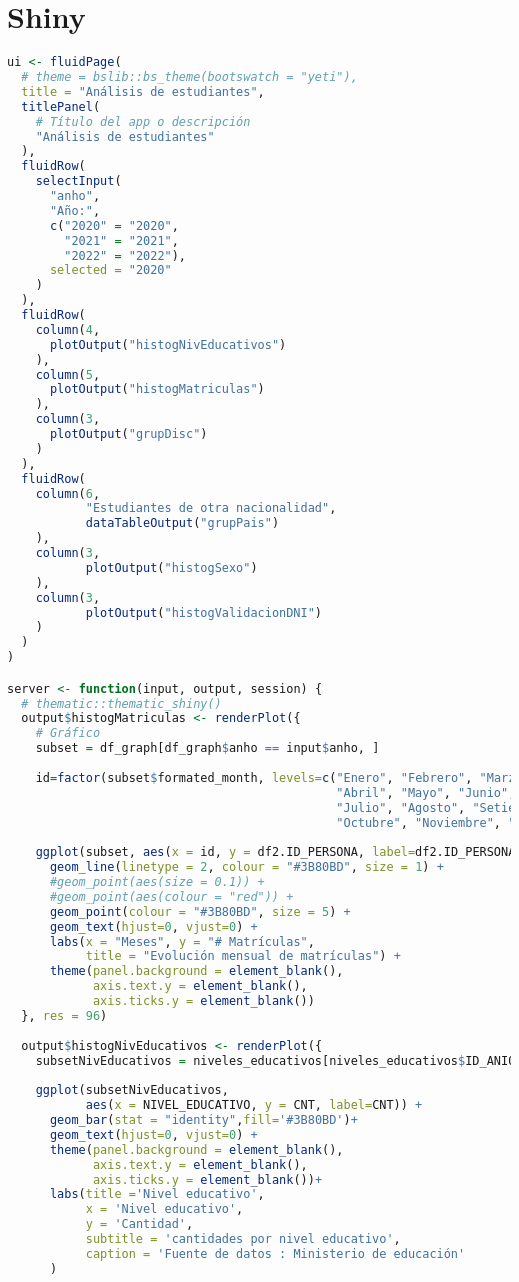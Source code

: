 \section{Shiny}\label{cod_shiny}
\begin{lstlisting}[language=R]
ui <- fluidPage(
  # theme = bslib::bs_theme(bootswatch = "yeti"),
  title = "Análisis de estudiantes",
  titlePanel(
    # Título del app o descripción
    "Análisis de estudiantes"
  ),
  fluidRow(
    selectInput(
      "anho",
      "Año:",
      c("2020" = "2020",
        "2021" = "2021",
        "2022" = "2022"),
      selected = "2020"
    )
  ),
  fluidRow(
    column(4,
      plotOutput("histogNivEducativos")
    ),
    column(5,
      plotOutput("histogMatriculas")
    ),
    column(3,
      plotOutput("grupDisc")
    )
  ),
  fluidRow(
    column(6,
           "Estudiantes de otra nacionalidad",
           dataTableOutput("grupPais") 
    ),
    column(3,
           plotOutput("histogSexo")
    ),
    column(3,
           plotOutput("histogValidacionDNI")
    )
  )
)

server <- function(input, output, session) {
  # thematic::thematic_shiny()
  output$histogMatriculas <- renderPlot({
    # Gráfico
    subset = df_graph[df_graph$anho == input$anho, ]
    
    id=factor(subset$formated_month, levels=c("Enero", "Febrero", "Marzo",
                                              "Abril", "Mayo", "Junio",
                                              "Julio", "Agosto", "Setiembre",
                                              "Octubre", "Noviembre", "Diciembre"))
    
    ggplot(subset, aes(x = id, y = df2.ID_PERSONA, label=df2.ID_PERSONA, group = 1)) +
      geom_line(linetype = 2, colour = "#3B80BD", size = 1) + 
      #geom_point(aes(size = 0.1)) +
      #geom_point(aes(colour = "red")) +
      geom_point(colour = "#3B80BD", size = 5) + 
      geom_text(hjust=0, vjust=0) + 
      labs(x = "Meses", y = "# Matrículas", 
           title = "Evolución mensual de matrículas") +
      theme(panel.background = element_blank(),
            axis.text.y = element_blank(),
            axis.ticks.y = element_blank())
  }, res = 96)
  
  output$histogNivEducativos <- renderPlot({
    subsetNivEducativos = niveles_educativos[niveles_educativos$ID_ANIO == input$anho, ]
    
    ggplot(subsetNivEducativos, 
           aes(x = NIVEL_EDUCATIVO, y = CNT, label=CNT)) +
      geom_bar(stat = "identity",fill='#3B80BD')+
      geom_text(hjust=0, vjust=0) +
      theme(panel.background = element_blank(),
            axis.text.y = element_blank(),
            axis.ticks.y = element_blank())+
      labs(title ='Nivel educativo',
           x = 'Nivel educativo',
           y = 'Cantidad',
           subtitle = 'cantidades por nivel educativo',
           caption = 'Fuente de datos : Ministerio de educación'
      )
    

\end{lstlisting}
